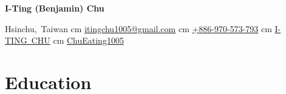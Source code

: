 \documentclass[10pt, letterpaper]{article}
\newenvironment{header}{
    \setlength{\topsep}{0pt}\par\kern\topsep\centering\linespread{1.5}
}{
    \par\kern\topsep
}
\let\hrefWithoutArrow\href
\renewcommand{\href}[2]{\hrefWithoutArrow{#1}{\ifthenelse{\equal{#2}{}}{ }{#2 }\raisebox{.15ex}{\footnotesize \faExternalLink*}}}
\begin{document}
    \begin{header}
        \textbf{\fontsize{20 pt}{20 pt}\selectfont I-Ting (Benjamin) Chu}

        \vspace{0.3 cm}

        \normalsize
        \mbox{{\color{black}\footnotesize\faMapMarker*}\hspace*{0.13cm}Hsinchu, Taiwan}%
         cm%
        \mbox{\hrefWithoutArrow{mailto:itingchu1005@gmail.com}{\color{black}{\footnotesize\faEnvelope[regular]}\hspace*{0.13cm}itingchu1005@gmail.com}}%
         cm%
        \mbox{\hrefWithoutArrow{tel:+886-970-573-793}{\color{black}{\footnotesize\faPhone*}\hspace*{0.13cm}+886-970-573-793}}%
         cm%
        \mbox{\hrefWithoutArrow{https://linkedin.com/in/itingchu}{\color{black}{\footnotesize\faLinkedinIn}\hspace*{0.13cm}I-TING CHU}}%
         cm%
        \mbox{\hrefWithoutArrow{https://github.com/ChuEating1005}{\color{black}{\footnotesize\faGithub}\hspace*{0.13cm}ChuEating1005}}%
    \end{header}

    \vspace{0.3 cm}

    \section{Education}
\end{document}
